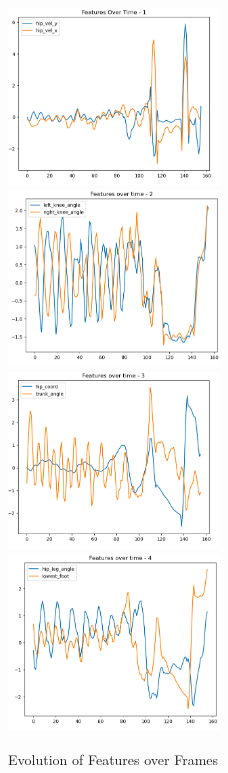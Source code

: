 \documentclass[12pt, letterpaper]{article}
\begin{document}
\begin{figure}[htbp]
    \includegraphics[width=0.5\textwidth]{plots/graph1.png}
    \includegraphics[width=0.5\textwidth]{plots/graph2.png}
    \includegraphics[width=0.5\textwidth]{plots/graph3.png}
    \includegraphics[width=0.5\textwidth]{plots/graph4.png}
    \caption{Evolution of Features over Frames}
\end{figure}
\end{document}
